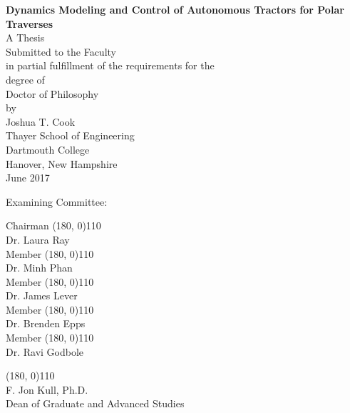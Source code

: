 \pagestyle{plain}
\begin{center}
\textbf{Dynamics Modeling and Control of Autonomous Tractors for Polar Traverses}\\
A Thesis\\
Submitted to the Faculty \\
in partial fulfillment of the requirements for the \\
degree of \\[0.4cm]
Doctor of Philosophy\\[0.4cm]
by\\[0.5cm]
Joshua T. Cook\\[0.4cm]
Thayer School of Engineering \\
Dartmouth College \\
Hanover, New Hampshire \\[0.4cm]
June 2017 %
\vspace{0.5cm}

\end{center}

Examining Committee:

\begin{flushright}
Chairman \line(180, 0){110} \\
Dr. Laura Ray \\[1cm]

Member \line(180, 0){110} \\
Dr. Minh Phan \\[1cm]

Member \line(180, 0){110} \\
Dr. James Lever \\[1cm]

Member \line(180, 0){110} \\
Dr. Brenden Epps\\[1cm]

Member \line(180, 0){110} \\
Dr. Ravi Godbole\\[1cm]


\end{flushright}

\begin{flushleft}
\line(180, 0){110} \\
F. Jon Kull, Ph.D.\\
Dean of Graduate and Advanced Studies\\[1cm]
\end{flushleft}






